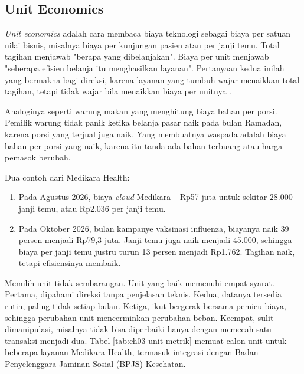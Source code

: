 \subsection{Unit Economics}

\textit{Unit economics} adalah cara membaca biaya teknologi sebagai biaya per satuan nilai bisnis,
misalnya biaya per kunjungan pasien atau per janji temu. Total tagihan menjawab "berapa yang
dibelanjakan". Biaya per unit menjawab "seberapa efisien belanja itu menghasilkan layanan".
Pertanyaan kedua inilah yang bermakna bagi direksi, karena layanan yang tumbuh wajar menaikkan total
tagihan, tetapi tidak wajar bila menaikkan biaya per unitnya \cite{storment2023}.

Analoginya seperti warung makan yang menghitung biaya bahan per porsi. Pemilik warung tidak panik
ketika belanja pasar naik pada bulan Ramadan, karena porsi yang terjual juga naik. Yang membuatnya
waspada adalah biaya bahan per porsi yang naik, karena itu tanda ada bahan terbuang atau harga
pemasok berubah.

Dua contoh dari Medikara Health:
\begin{enumerate}
  \item Pada Agustus 2026, biaya \textit{cloud} Medikara+ Rp57 juta untuk sekitar 28.000 janji temu,
        atau Rp2.036 per janji temu.
  \item Pada Oktober 2026, bulan kampanye vaksinasi influenza, biayanya naik 39 persen menjadi
        Rp79,3 juta. Janji temu juga naik menjadi 45.000, sehingga biaya per janji temu justru turun
        13 persen menjadi Rp1.762. Tagihan naik, tetapi efisiensinya membaik.
\end{enumerate}

Memilih unit tidak sembarangan. Unit yang baik memenuhi empat syarat. Pertama, dipahami direksi
tanpa penjelasan teknis. Kedua, datanya tersedia rutin, paling tidak setiap bulan. Ketiga, ikut
bergerak bersama pemicu biaya, sehingga perubahan unit mencerminkan perubahan beban. Keempat, sulit
dimanipulasi, misalnya tidak bisa diperbaiki hanya dengan memecah satu transaksi menjadi dua. Tabel
\ref{tab:ch03-unit-metrik} memuat calon unit untuk beberapa layanan Medikara Health, termasuk
integrasi dengan Badan Penyelenggara Jaminan Sosial (BPJS) Kesehatan.

